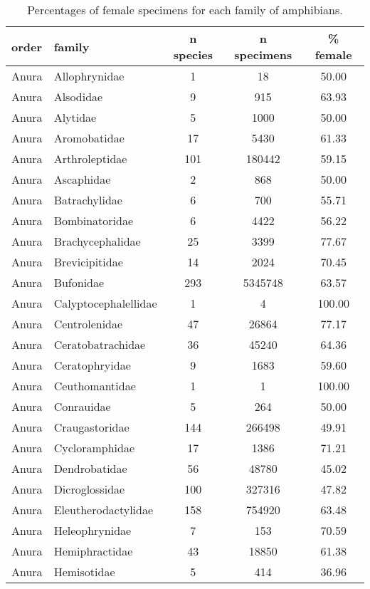 \begin{longtable}{llccc}
\caption{Percentages of female specimens for each family of amphibians.} \\ 
  \hline
order & family & n species & n specimens & \% female \\ 
  \hline
Anura & Allophrynidae &   1 &  18 & 50.00 \\ 
  Anura & Alsodidae &   9 & 915 & 63.93 \\ 
  Anura & Alytidae &   5 & 1000 & 50.00 \\ 
  Anura & Aromobatidae &  17 & 5430 & 61.33 \\ 
  Anura & Arthroleptidae & 101 & 180442 & 59.15 \\ 
  Anura & Ascaphidae &   2 & 868 & 50.00 \\ 
  Anura & Batrachylidae &   6 & 700 & 55.71 \\ 
  Anura & Bombinatoridae &   6 & 4422 & 56.22 \\ 
  Anura & Brachycephalidae &  25 & 3399 & 77.67 \\ 
  Anura & Brevicipitidae &  14 & 2024 & 70.45 \\ 
  Anura & Bufonidae & 293 & 5345748 & 63.57 \\ 
  Anura & Calyptocephalellidae &   1 &   4 & 100.00 \\ 
  Anura & Centrolenidae &  47 & 26864 & 77.17 \\ 
  Anura & Ceratobatrachidae &  36 & 45240 & 64.36 \\ 
  Anura & Ceratophryidae &   9 & 1683 & 59.60 \\ 
  Anura & Ceuthomantidae &   1 &   1 & 100.00 \\ 
  Anura & Conrauidae &   5 & 264 & 50.00 \\ 
  Anura & Craugastoridae & 144 & 266498 & 49.91 \\ 
  Anura & Cycloramphidae &  17 & 1386 & 71.21 \\ 
  Anura & Dendrobatidae &  56 & 48780 & 45.02 \\ 
  Anura & Dicroglossidae & 100 & 327316 & 47.82 \\ 
  Anura & Eleutherodactylidae & 158 & 754920 & 63.48 \\ 
  Anura & Heleophrynidae &   7 & 153 & 70.59 \\ 
  Anura & Hemiphractidae &  43 & 18850 & 61.38 \\ 
  Anura & Hemisotidae &   5 & 414 & 36.96 \\ 

\end{longtable}
